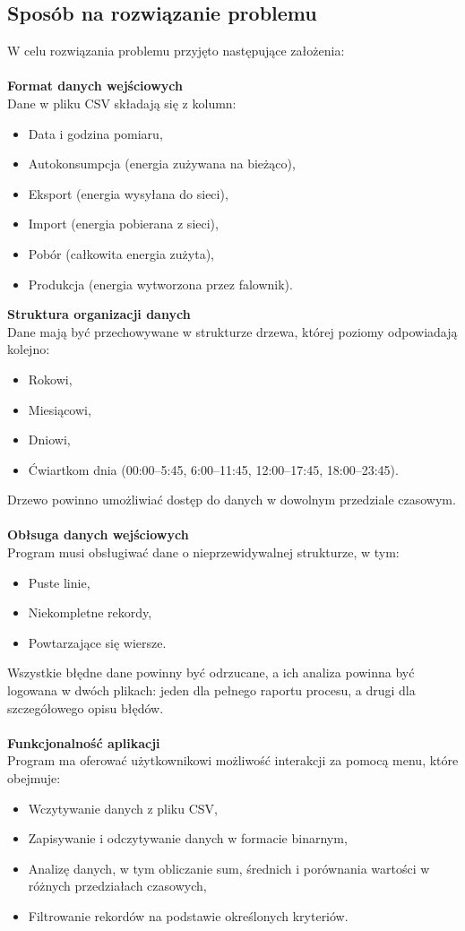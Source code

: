 \subsection{Sposób na rozwiązanie problemu}
W celu rozwiązania problemu przyjęto następujące założenia:
\\ \\
\textbf{Format danych wejściowych}
\\
Dane w pliku CSV składają się z kolumn:
\begin{itemize}
    \item Data i godzina pomiaru,
    \item Autokonsumpcja (energia zużywana na bieżąco),
    \item Eksport (energia wysyłana do sieci),
    \item Import (energia pobierana z sieci),
    \item Pobór (całkowita energia zużyta),
    \item Produkcja (energia wytworzona przez falownik).
\end{itemize}
\newpage
\noindent \textbf{Struktura organizacji danych}
\\
Dane mają być przechowywane w strukturze drzewa, której poziomy odpowiadają kolejno:
\begin{itemize}
    \item Rokowi,
    \item Miesiącowi,
    \item Dniowi,
    \item Ćwiartkom dnia (00:00–5:45, 6:00–11:45, 12:00–17:45, 18:00–23:45).
\end{itemize}
Drzewo powinno umożliwiać dostęp do danych w dowolnym przedziale czasowym.
\\ \\
\textbf{Obłsuga danych wejściowych}
\\
Program musi obsługiwać dane o nieprzewidywalnej strukturze, w tym:
\begin{itemize}
    \item Puste linie,
    \item Niekompletne rekordy,
    \item Powtarzające się wiersze.
\end{itemize}
Wszystkie błędne dane powinny być odrzucane, a ich analiza powinna być logowana w dwóch plikach: jeden dla pełnego raportu procesu, a drugi dla szczegółowego opisu błędów.
\\ \\
\textbf{Funkcjonalność aplikacji}
\\ 
Program ma oferować użytkownikowi możliwość interakcji za pomocą menu, które obejmuje:
\begin{itemize}
    \item Wczytywanie danych z pliku CSV,
    \item Zapisywanie i odczytywanie danych w formacie binarnym,
    \item Analizę danych, w tym obliczanie sum, średnich i porównania wartości w różnych przedziałach czasowych,
    \item Filtrowanie rekordów na podstawie określonych kryteriów.
\end{itemize}
\newpage
